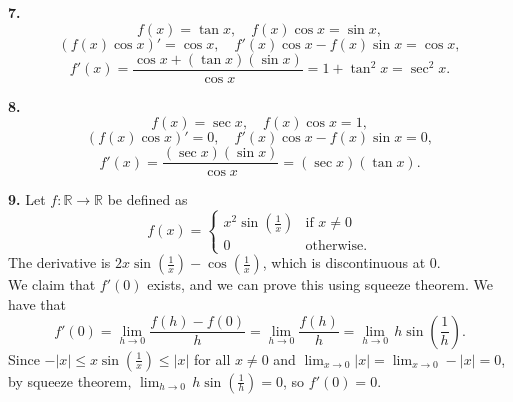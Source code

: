\documentclass{article}
\newcommand{\R}{\mathbb{R}}
\begin{document}
\textbf{7.} $$f(x) = \tan x, \quad f(x)\cos x = \sin x,$$
$$(f(x)\cos x)' = \cos x, \quad f'(x)\cos x - f(x)\sin x = \cos x,$$
$$f'(x) = \frac{\cos x + (\tan x)(\sin x)}{\cos x} = 1 + \tan^2 x = \sec^2 x.$$

\textbf{8.} $$f(x) = \sec x, \quad f(x)\cos x = 1,$$
$$(f(x)\cos x)' = 0, \quad f'(x)\cos x - f(x)\sin x = 0,$$
$$f'(x) = \frac{(\sec x)(\sin x)}{\cos x} = (\sec x)(\tan x).$$

\textbf{9.} Let $f: \R \to \R$ be defined as
$$f(x) = \begin{cases}
    x^2\sin\left(\frac{1}{x}\right) & \text{if } x \neq 0 \\
    0 & \text{otherwise}.
\end{cases}$$
The derivative is $2x\sin\left(\frac{1}{x}\right) - \cos\left(\frac{1}{x}\right)$, which is discontinuous at $0$. \\

We claim that $f'(0)$ exists, and we can prove this using squeeze theorem. We have that
$$f'(0) = \lim_{h\to 0} \frac{f(h) - f(0)}{h} = \lim_{h\to 0} \frac{f(h)}{h} = \lim_{h\to 0}\, h\sin\left(\frac{1}{h}\right).$$
Since $-|x| \le x\sin\left(\frac{1}{x}\right) \le |x|$ for all $x \neq 0$ and $\lim_{x \to 0} |x| = \lim_{x \to 0} -|x| = 0$, by squeeze theorem, $\lim_{h\to 0}\, h\sin\left(\frac{1}{h}\right) = 0$, so $f'(0) = 0$.
\end{document}
